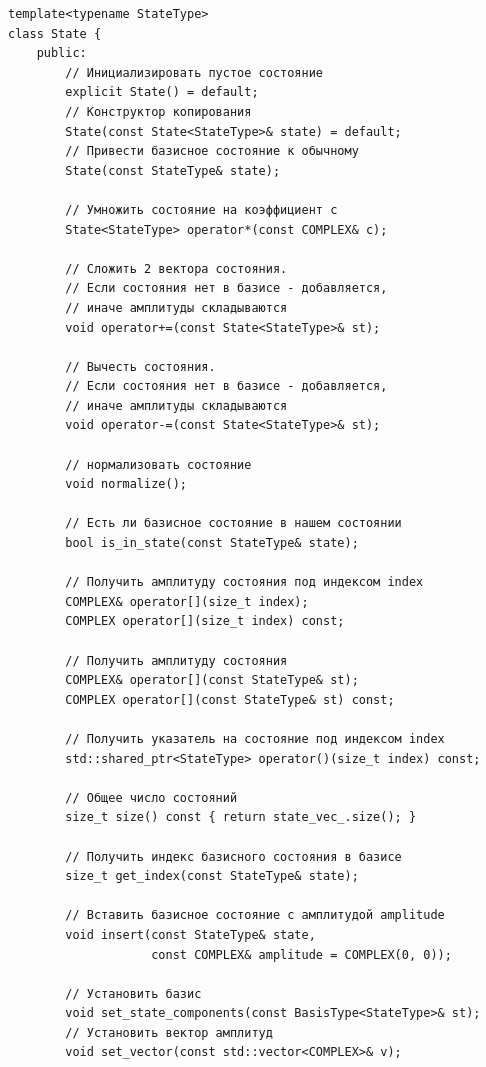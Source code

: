 \documentclass[12pt,fleqn]{article}
\begin{document}
\begin{mdframed}[linecolor=black, topline=true, bottomline=true,
    leftline=false, rightline=false]
\begin{verbatim}
template<typename StateType>
class State {
    public:
        // Инициализировать пустое состояние
        explicit State() = default;
        // Конструктор копирования
        State(const State<StateType>& state) = default;
        // Привести базисное состояние к обычному
        State(const StateType& state);

        // Умножить состояние на коэффициент c
        State<StateType> operator*(const COMPLEX& c);

        // Сложить 2 вектора состояния.
        // Если состояния нет в базисе - добавляется,
        // иначе амплитуды складываются
        void operator+=(const State<StateType>& st);

        // Вычесть состояния.
        // Если состояния нет в базисе - добавляется,
        // иначе амплитуды складываются
        void operator-=(const State<StateType>& st);

        // нормализовать состояние
        void normalize();

        // Есть ли базисное состояние в нашем состоянии
        bool is_in_state(const StateType& state);

        // Получить амплитуду состояния под индексом index
        COMPLEX& operator[](size_t index);
        COMPLEX operator[](size_t index) сonst;

        // Получить амплитуду состояния
        COMPLEX& operator[](const StateType& st);
        COMPLEX operator[](const StateType& st) const;

        // Получить указатель на состояние под индексом index
        std::shared_ptr<StateType> operator()(size_t index) const;

        // Общее число состояний
        size_t size() const { return state_vec_.size(); }

        // Получить индекс базисного состояния в базисе
        size_t get_index(const StateType& state);

        // Вставить базисное состояние с амплитудой amplitude
        void insert(const StateType& state, 
                    const COMPLEX& amplitude = COMPLEX(0, 0));

        // Установить базис
        void set_state_components(const BasisType<StateType>& st);
        // Установить вектор амплитуд
        void set_vector(const std::vector<COMPLEX>& v);


\end{verbatim}
\end{mdframed}
\end{document}
